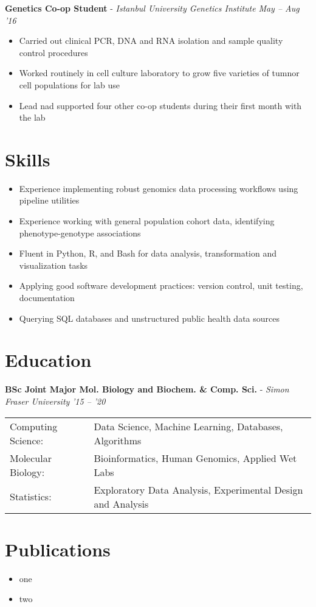 \documentclass{article}
\newcommand{\experienceheader}[3]{\customitem \textbf{#1} - \textit{#2} \hfill \textit{#3}}
\newcommand{\customsection}[1]{\section*{#1} \vspace{-.3cm} \hrulefill}
\begin{document}
\begin{itemize}
\begin{itemize}
    \end{itemize}
  \experienceheader{Genetics Co-op Student}{Istanbul University Genetics Institute}{May -- Aug '16}
    \begin{itemize}
      \item Carried out clinical PCR, DNA and RNA isolation and sample quality control procedures
      \item Worked routinely in cell culture laboratory to grow five varieties of tumnor cell populations for lab use
      \item Lead nad supported four other co-op students during their first month with the lab
    \end{itemize}
\end{itemize}

\customsection{Skills}
\begin{itemize}
  \item Experience implementing robust genomics data processing workflows using pipeline utilities
  \item Experience working with general population cohort data, identifying phenotype-genotype associations
  \item Fluent in Python, R, and Bash for data analysis, transformation and visualization tasks
  \item Applying good software development practices: version control, unit testing, documentation
  \item Querying SQL databases and unstructured public health data sources
\end{itemize}

\customsection{Education}
\begin{itemize}
\experienceheader{BSc Joint Major Mol. Biology and Biochem. \& Comp. Sci.}{Simon Fraser University}{'15 -- '20}
\begin{tabular}{ l l }
    Computing Science: & Data Science, Machine Learning, Databases, Algorithms \\
    Molecular Biology: & Bioinformatics, Human Genomics, Applied Wet Labs \\
    Statistics: & Exploratory Data Analysis, Experimental Design and Analysis
  \end{tabular}
\end{itemize}

\customsection{Publications}
\begin{itemize}
  \item one
  \item two
\end{itemize}
\end{document}
